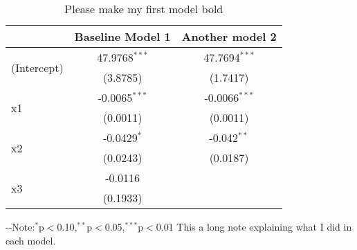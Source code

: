 \begin{table}[H] 
\centering 
\caption{Please make my first model bold} 
\label{tab:myLabel}
\begin{threeparttable}
\begin{tabular}{lcc}
\toprule 
& \textbf{Baseline Model} 1 & Another model 2 \\ 
\midrule 
\multirow{2}{*}{(Intercept)}&47.9768$^{***}$ & 47.7694$^{***}$ \\ 
& (3.8785) & (1.7417) \\ 
\multirow{2}{*}{x1}&-0.0065$^{***}$ & -0.0066$^{***}$ \\ 
& (0.0011) & (0.0011) \\ 
\multirow{2}{*}{x2}&-0.0429$^{*}$ & -0.042$^{**}$ \\ 
& (0.0243) & (0.0187) \\ 
\multirow{2}{*}{x3}&-0.0116 &  \\ 
& (0.1933) &  \\ 
\bottomrule 
\end{tabular} 
\begin{tablenotes} 
\scriptsize 
\item \leavevmode\kern-\scriptspace\kern- Note:$^{*}$p$<$0.10,$^{**}$p$<$0.05,$^{***}$p$<$0.01 This a long note explaining what I did in each model. 
\end{tablenotes}
\end{threeparttable} 
\end{table} 
 